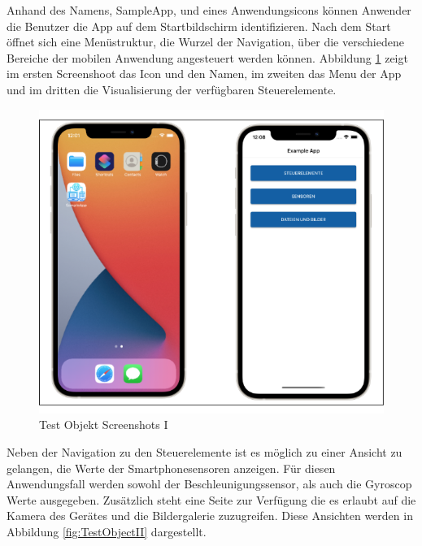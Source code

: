 Anhand des Namens,  SampleApp,  und eines Anwendungsicons können Anwender die Benutzer die App auf dem Startbildschirm identifizieren.  Nach dem Start öffnet sich eine Menüstruktur,  die Wurzel der Navigation, über die verschiedene Bereiche der mobilen Anwendung angesteuert werden können.  Abbildung \ref{fig:TestObjectI} zeigt im ersten Screenshoot das Icon und den Namen,  im zweiten das Menu der App und im dritten die Visualisierung der verfügbaren Steuerelemente.

\newpage
\begin{figure}[!ht]
 \includegraphics[width=\textwidth,keepaspectratio]{Images/Screenshot/AppIconAndMenu.png}
 \caption{Test Objekt Screenshots I}
 \label{fig:TestObjectI}
\end{figure}
Neben der Navigation zu den Steuerelemente ist es  möglich zu einer Ansicht zu gelangen,  die 
 Werte der Smartphonesensoren anzeigen. Für diesen Anwendungsfall werden sowohl der Beschleunigungssensor,  als auch die Gyroscop Werte ausgegeben.
 Zusätzlich steht eine Seite zur Verfügung die es erlaubt auf die Kamera des Gerätes und die Bildergalerie zuzugreifen.  Diese Ansichten werden in Abbildung \ref{fig:TestObjectII} dargestellt.


